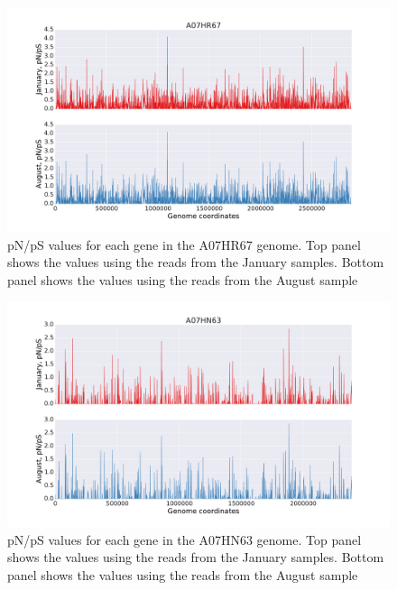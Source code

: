 \begin{figure}[p]
  \centering
  \includegraphics[width=\textwidth,height=\textheight,keepaspectratio]{Chapter5/Figures/pn_ps_plots/A07HR67_pNpS_density.pdf}
  \caption{pN/pS values for each gene in the A07HR67 genome. Top panel shows the values using the reads from the January samples. Bottom panel shows the values using the reads from the August sample}
  \label{A07HR67_pNpS}
\end{figure}

\begin{figure}[p]
  \centering
  \includegraphics[width=\textwidth,height=\textheight,keepaspectratio]{Chapter5/Figures/pn_ps_plots/A07HN63_pNpS_density.pdf}
  \caption{pN/pS values for each gene in the A07HN63 genome. Top panel shows the values using the reads from the January samples. Bottom panel shows the values using the reads from the August sample}
  \label{A07HN63_pNpS}
\end{figure}

